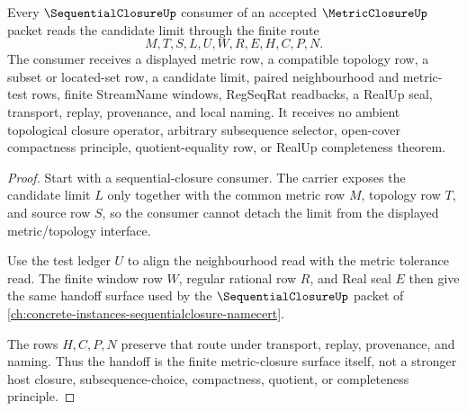 \begin{theorem}
\label{thm:metric-closure-sequential-closure-handoff}
Every $\SequentialClosureUp$ consumer of an accepted $\MetricClosureUp$ packet reads the candidate limit through the finite route
$$
M,T,S,L,U,W,R,E,H,C,P,N.
$$
The consumer receives a displayed metric row, a compatible topology row, a subset or located-set row, a candidate limit, paired neighbourhood and metric-test rows, finite StreamName windows, RegSeqRat readbacks, a RealUp seal, transport, replay, provenance, and local naming. It receives no ambient topological closure operator, arbitrary subsequence selector, open-cover compactness principle, quotient-equality row, or RealUp completeness theorem.
\end{theorem}
\begin{proof}
Start with a sequential-closure consumer. The carrier exposes the candidate limit $L$ only together with the common metric row $M$, topology row $T$, and source row $S$, so the consumer cannot detach the limit from the displayed metric/topology interface.

Use the test ledger $U$ to align the neighbourhood read with the metric tolerance read. The finite window row $W$, regular rational row $R$, and Real seal $E$ then give the same handoff surface used by the $\SequentialClosureUp$ packet of \autoref{ch:concrete-instances-sequentialclosure-namecert}.

The rows $H,C,P,N$ preserve that route under transport, replay, provenance, and naming. Thus the handoff is the finite metric-closure surface itself, not a stronger host closure, subsequence-choice, compactness, quotient, or completeness principle.
\end{proof}



